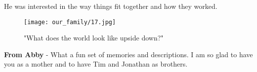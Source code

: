 He was interested in the way things fit together and how they worked.
\begin{figure}
\centering
\texttt{[image: our\_family/17.jpg]}
\caption{
"What does the world look like upside down?"
}
\end{figure}

\textbf{From Abby} - What a fun set of memories and descriptions.
I am so glad to have you as a mother and to have Tim and Jonathan as brothers.





